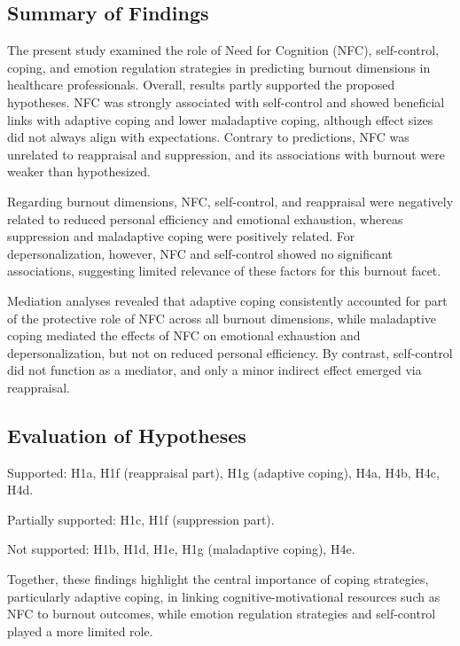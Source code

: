 \documentclass[
  english,
  man]{apa6}
\begin{document}
\subsection{Summary of Findings}\label{summary-of-findings}

The present study examined the role of Need for Cognition (NFC), self-control, coping, and emotion regulation strategies in predicting burnout dimensions in healthcare professionals. Overall, results partly supported the proposed hypotheses. NFC was strongly associated with self-control and showed beneficial links with adaptive coping and lower maladaptive coping, although effect sizes did not always align with expectations. Contrary to predictions, NFC was unrelated to reappraisal and suppression, and its associations with burnout were weaker than hypothesized.

Regarding burnout dimensions, NFC, self-control, and reappraisal were negatively related to reduced personal efficiency and emotional exhaustion, whereas suppression and maladaptive coping were positively related. For depersonalization, however, NFC and self-control showed no significant associations, suggesting limited relevance of these factors for this burnout facet.

Mediation analyses revealed that adaptive coping consistently accounted for part of the protective role of NFC across all burnout dimensions, while maladaptive coping mediated the effects of NFC on emotional exhaustion and depersonalization, but not on reduced personal efficiency. By contrast, self-control did not function as a mediator, and only a minor indirect effect emerged via reappraisal.

\subsection{Evaluation of Hypotheses}\label{evaluation-of-hypotheses}

Supported: H1a, H1f (reappraisal part), H1g (adaptive coping), H4a, H4b, H4c, H4d.

Partially supported: H1c, H1f (suppression part).

Not supported: H1b, H1d, H1e, H1g (maladaptive coping), H4e.

Together, these findings highlight the central importance of coping strategies, particularly adaptive coping, in linking cognitive-motivational resources such as NFC to burnout outcomes, while emotion regulation strategies and self-control played a more limited role.
\end{document}
